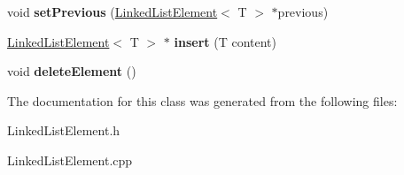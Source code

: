 \begin{DoxyCompactItemize}
void {\bfseries set\+Previous} (\mbox{\hyperlink{class_linked_list_element}{Linked\+List\+Element}}$<$ T $>$ $\ast$previous)
\item 
\mbox{\label{class_linked_list_element_a64d9fa8a99df18fe29619431e3e68da2}} 
\mbox{\hyperlink{class_linked_list_element}{Linked\+List\+Element}}$<$ T $>$ $\ast$ {\bfseries insert} (T content)
\item 
\mbox{\label{class_linked_list_element_abad575d24768cff94a414901f9b5de69}} 
void {\bfseries delete\+Element} ()
\end{DoxyCompactItemize}


The documentation for this class was generated from the following files\+:\begin{DoxyCompactItemize}
\item 
Linked\+List\+Element.\+h\item 
Linked\+List\+Element.\+cpp\end{DoxyCompactItemize}
